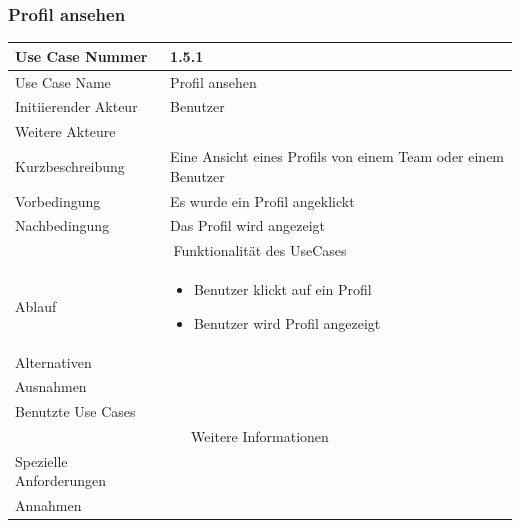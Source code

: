 \documentclass[10pt,a4paper]{article}
\begin{document}
	\subsubsection{Profil ansehen}
		\begin{tabular}{|l|p{.5\linewidth}|}
		\hline Use Case Nummer & 1.5.1 \\ 
		\hline Use Case Name & Profil ansehen \\ 
		\hline Initiierender Akteur & Benutzer \\
		\hline Weitere Akteure &  \\
		\hline Kurzbeschreibung & Eine Ansicht eines Profils von einem Team oder einem Benutzer \\
		\hline Vorbedingung & Es wurde ein Profil angeklickt \\
		\hline Nachbedingung & Das Profil wird angezeigt \\
		\hline \multicolumn{2}{|c|}{Funktionalität des UseCases}\\
		\hline Ablauf & \begin{itemize}
			\item Benutzer klickt auf ein Profil
			\item Benutzer wird Profil angezeigt
		\end{itemize} \\
		\hline Alternativen &  \\
		\hline Ausnahmen &  \\
		\hline Benutzte Use Cases &  \\
		\hline \multicolumn{2}{|c|}{Weitere Informationen} \\
		\hline Spezielle Anforderungen &  \\
		\hline Annahmen &  \\
		\hline
		\end{tabular}
\end{document}
